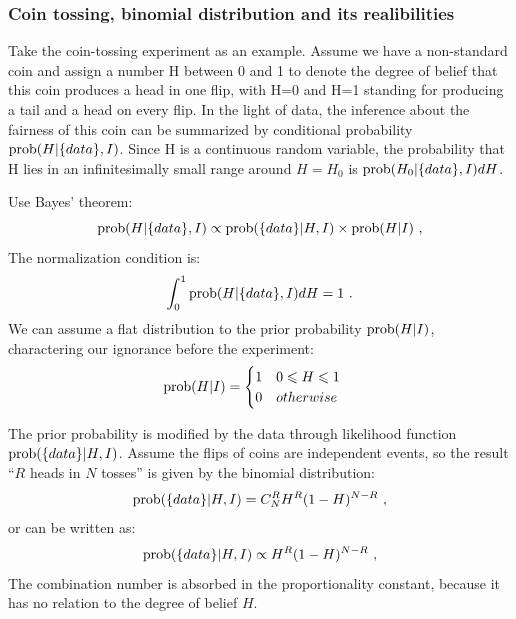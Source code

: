 \documentclass[11pt, a4paper]{article}
\begin{document}
\subsubsection{Coin tossing, binomial distribution and its realibilities}
\quad

Take the coin-tossing experiment as an example. Assume we have a non-standard coin and assign a number H between 0 and 1 to denote the degree of belief that this coin produces a head in one flip, with H=0 and H=1 standing for producing a tail and a head on every flip. In the light of data, the inference about the fairness of this coin can be summarized by conditional probability ${\rm prob}(H|\{data\},I)$. Since H is a continuous random variable, the probability that H lies in an infinitesimally small range around $H=H_0$ is ${\rm prob}(H_0|\{data\},I)dH$.

Use Bayes' theorem:
\begin{equation}
{\rm prob} (H|\{data\},I) \propto {\rm prob}(\{data\}|H,I) \times {\rm prob}(H|I)~,
\end{equation}
The normalization condition is:
\begin{equation}
\int_0^1 {\rm prob}(H|\{data\},I)dH=1~.
\end{equation}
We can assume a flat distribution to the prior probability ${\rm prob}(H|I)$, charactering our ignorance before the experiment:
\begin{equation}
{\rm prob}(H|I)=%
\begin{cases}
1\quad0\leqslant H \leqslant 1 \\
0\quad otherwise
\end{cases}
\end{equation}

The prior probability is modified by the data through likelihood function ${\rm prob}(\{data\}|H,I)$. Assume the flips of coins are independent events, so the result ``$R$ heads in $N$ tosses'' is given by the binomial distribution:
\begin{equation}
{\rm prob}(\{data\}|H,I)=C_N^R H^R (1-H)^{N-R}~,
\end{equation}
or can be written as:
\begin{equation}\label{cointossingpost}
{\rm prob}(\{data\}|H,I)\propto H^R (1-H)^{N-R}~,
\end{equation}
The combination number is absorbed in the proportionality constant, because it has no relation to the degree of belief $H$.
\end{document}
